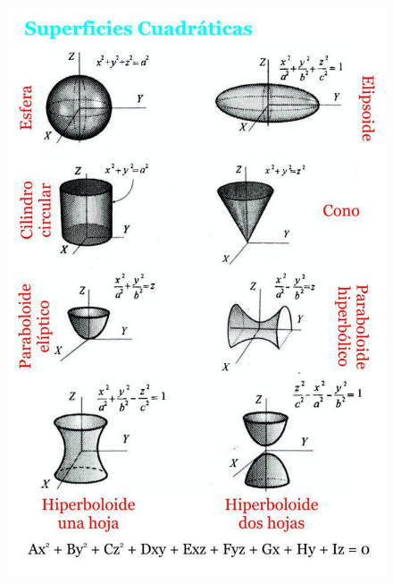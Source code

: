 \documentclass[a4paper]{article}
\begin{document}
\begin{figure}[h!]
	\centering
	\includegraphics[width=0.87\linewidth]{./imagenes/cuadricas.jpg}
\end{figure}
\end{document}
